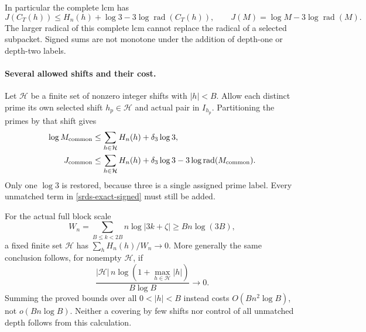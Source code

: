 In particular the complete lcm has
\[
 J(C_T(h))\le H_n(h)+\log3-3\log\operatorname{rad}(C_T(h)),
 \qquad J(M)=\log M-3\log\operatorname{rad}(M).
\]
The larger radical of this complete lcm cannot replace the
radical of a selected subpacket. Signed sums are not monotone
under the addition of depth-one or depth-two labels.

\paragraph{Several allowed shifts and their cost.}
Let \(\mathcal H\) be a finite set of nonzero integer shifts
with \(|h|<B\). Allow each distinct prime its own selected
shift \(h_p\in\mathcal H\) and actual pair in \(I_{h_p}\).
Partitioning the primes by that shift gives
\begin{equation}
 \begin{split}
 \log M_{\rm common}
     &\le\sum_{h\in\mathcal H}H_n(h)+\delta_3\log3,\\
 J_{\rm common}
     &\le\sum_{h\in\mathcal H}H_n(h)+\delta_3\log3
                 -3\log\operatorname{rad}(M_{\rm common}).
 \end{split}
 \label{srds-multishift}
\end{equation}
Only one \(\log3\) is restored, because three is a single assigned
prime label. Every unmatched term in \eqref{srds-exact-signed}
must still be added.

For the actual full block scale
\[
 W_n=\sum_{B\le k<2B}n\log|3k+\zeta|
       \ge Bn\log(3B),
\]
a fixed finite set \(\mathcal H\) has
\(\sum_hH_n(h)/W_n\longrightarrow0\).
More generally the same conclusion follows, for nonempty
\(\mathcal H\), if
\[
 \frac{|\mathcal H|\,n\log(1+\max_{h\in\mathcal H}|h|)}
      {B\log B}\longrightarrow0.
\]
Summing the proved bounds over all \(0<|h|<B\) instead costs
\(O(Bn^2\log B)\), not \(o(Bn\log B)\).
Neither a covering by few shifts nor control of all unmatched
depth follows from this calculation.

